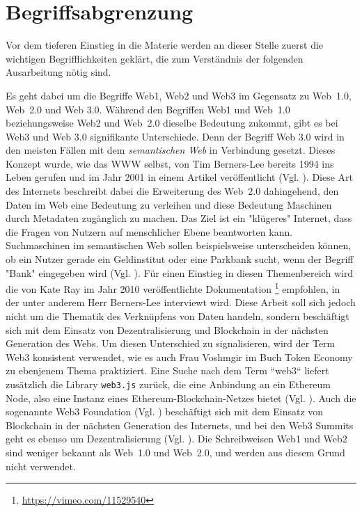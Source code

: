\section{Begriffsabgrenzung}

Vor dem tieferen Einstieg in die Materie werden an dieser Stelle zuerst die wichtigen Begrifflichkeiten geklärt, die zum Verständnis der folgenden Ausarbeitung nötig sind.

Es geht dabei um die Begriffe Web1, Web2 und Web3 im Gegensatz zu Web~1.0, Web~2.0 und Web 3.0. 
Während den Begriffen Web1 und Web~1.0 beziehungsweise Web2 und Web~2.0 dieselbe Bedeutung zukommt, gibt es bei Web3 und Web 3.0 signifikante Unterschiede. 
Denn der Begriff Web 3.0 wird in den meisten Fällen mit dem {\itshape semantischen Web} in Verbindung gesetzt. 
Dieses Konzept wurde, wie das WWW selbst, von Tim Berners-Lee bereits 1994 ins Leben gerufen und im Jahr 2001 in einem Artikel veröffentlicht (Vgl. \cite{Sweeney.2016}).
Diese Art des Internets beschreibt dabei die Erweiterung des Web~2.0 dahingehend, den Daten im Web eine Bedeutung zu verleihen und diese Bedeutung Maschinen durch Metadaten zugänglich zu machen. Das Ziel ist ein "klügeres" Internet, dass die Fragen von Nutzern auf menschlicher Ebene beantworten kann. Suchmaschinen im semantischen Web sollen beispielsweise unterscheiden können, ob ein Nutzer gerade ein Geldinstitut oder eine Parkbank sucht, wenn der Begriff "Bank" eingegeben wird (Vgl. \cite{Hilz.}). 
Für einen Einstieg in diesen Themenbereich wird die von Kate Ray im Jahr 2010 veröffentlichte Dokumentation
\footnote{
	\url{https://vimeo.com/11529540}
}
empfohlen, in der unter anderem Herr Berners-Lee interviewt wird. 
Diese Arbeit soll sich jedoch nicht um die Thematik des Verknüpfens von Daten handeln, sondern beschäftigt sich mit dem Einsatz von Dezentralisierung und Blockchain in der nächsten Generation des Webs. 
Um diesen Unterschied zu signalisieren, wird der Term Web3 konsistent verwendet, wie es auch Frau Voshmgir im Buch Token Economy zu ebenjenem Thema praktiziert. Eine Suche nach dem Term ``web3`` liefert zusätzlich die Library \verb|web3.js| zurück, die eine Anbindung an ein Ethereum Node, also eine Instanz eines Ethereum-Blockchain-Netzes bietet (Vgl. \cite{Ethereum.2019}). Auch die sogenannte Web3 Foundation (Vgl. \cite{Web3Foundation.2019}) beschäftigt sich mit dem Einsatz von Blockchain in der nächsten Generation des Internets, und bei den Web3 Summits geht es ebenso um Dezentralisierung (Vgl. \cite{Web3Summit.2019}). 
Die Schreibweisen Web1 und Web2 sind weniger bekannt als Web~1.0 und Web~2.0, und werden aus diesem Grund nicht verwendet.

